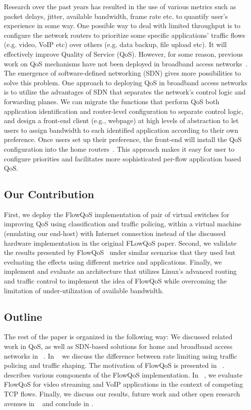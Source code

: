 Research over the past years has resulted in the use of various metrics such as packet delays, jitter, available bandwidth, frame rate etc. to quantify user’s experience in some way. One possible way to deal with limited throughput is to configure the network routers to prioritize some specific applications' traffic flows (e.g. video, VoIP etc) over others (e.g. data backup, file upload etc). It will effectively improve Quality of Service (QoS). However, for some reason, previous work on QoS mechanisms have not been deployed in broadband access networks~\cite{Seddiki2014}. The emergence of software-defined networking (SDN) gives more possibilities to solve this problem. One approach to deploying QoS in broadband access networks is to utilize the advantages of SDN that separates the network's control logic and forwarding planes. We can migrate the functions that perform QoS both application identification and router-level configuration to separate control logic, and design a front-end client (e.g., webpage) at high levels of abstraction to let users to assign bandwidth to each identified application according to their own preference. Once users set up their preference, the front-end will install the QoS configuration into the home routers~\cite{Seddiki2014}. This approach makes it easy for user to configure priorities and facilitates more sophisticated per-flow application based QoS. 

\subsection{Our Contribution}
First, we deploy the FlowQoS implementation of pair of virtual switches for improving QoS using classification and traffic policing, within a virtual machine (emulating our end-host) with Internet connection instead of the discussed hardware implementation in the original FLowQoS paper. Second, we validate the results presented by FlowQoS~\cite{Seddiki2014} under similar scenarios that they used but eveluating the effects using different metrics and applications. Finally, we implement and evaluate an architecture that utilizes Linux’s advanced routing and traffic control to implement the idea of FlowQoS while overcoming the limitation of under-utilization of available bandwidth. 

\subsection{Outline}
The rest of the paper is organized in the following way: We discussed related work in QoS, as well as SDN-based solutions for home and broadband access networks in ~. In ~ we discuss the difference between rate limiting using traffic policing and traffic shaping. The motivation of FlowQoS is presented in ~. ~ describes various components of the FlowQoS implementation. In ~, we evaluate FlowQoS for video streaming and VoIP applications in the context of competing TCP flows. Finally, we discuss our results, future work and other open research avenues in ~ and conclude in .